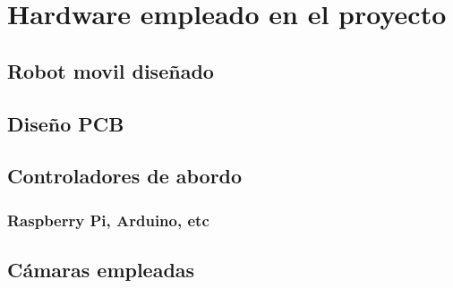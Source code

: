 \section{Hardware empleado en el proyecto}

\subsection{Robot movil diseñado}
\subsection{Diseño PCB}
\subsection{Controladores de abordo}
\subsubsection{Raspberry Pi, Arduino, etc}
\subsection{Cámaras empleadas}
